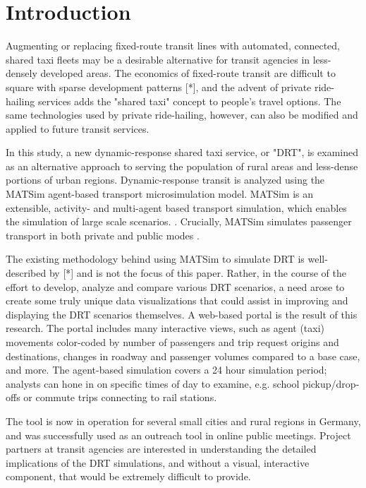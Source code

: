 \documentclass[3p,times,procedia]{elsarticle}
\begin{document}

\section{Introduction}
\label{introduction}

Augmenting or replacing fixed-route transit lines with automated, connected, shared taxi fleets may be a desirable alternative for transit agencies in less-densely developed areas. The economics of fixed-route transit are difficult to square with sparse development patterns [*], and the advent of private ride-hailing services adds the "shared taxi" concept to people's travel options. The same technologies used by private ride-hailing, however, can also be modified and applied to future transit services.

In this study, a new dynamic-response shared taxi service, or "DRT", is examined as an alternative approach to serving the population of rural areas and less-dense portions of urban regions. Dynamic-response transit is analyzed using the MATSim agent-based transport microsimulation model. MATSim is an extensible, activity- and multi-agent based transport simulation, which enables the simulation of large scale scenarios. \cite{MATSimBook}. Crucially, MATSim simulates passenger transport in both private and public modes \cite{ZiemkeEtAl2019OpenBerlinScenario}.

The existing methodology behind using MATSim to simulate DRT is well-described by [*] and is not the focus of this paper. Rather, in the course of the effort to develop, analyze and compare various DRT scenarios, a need arose to create some truly unique data visualizations that could assist in improving and displaying the DRT scenarios themselves. A web-based portal is the result of this research. The portal includes many interactive views, such as agent (taxi) movements color-coded by number of passengers and trip request origins and destinations, changes in roadway and passenger volumes compared to a base case, and more. The agent-based simulation covers a 24 hour simulation period; analysts can hone in on specific times of day to examine, e.g. school pickup/drop-offs or commute trips connecting to rail stations.

The tool is now in operation for several small cities and rural regions in Germany, and was successfully used as an outreach tool in online public meetings. Project partners at transit agencies are interested in understanding the detailed implications of the DRT simulations, and without a visual, interactive component, that would be extremely difficult to provide.
\end{document}
